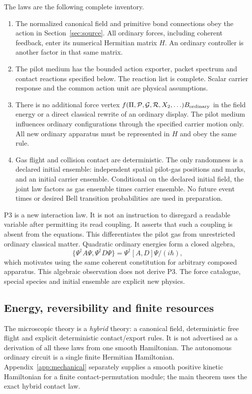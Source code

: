 \documentclass[11pt]{article}
\theoremstyle{definition}\newtheorem{definition}[theorem]{Definition}
\theoremstyle{remark}\newtheorem{remark}[theorem]{Remark}
\begin{document}
The laws are the following complete inventory.
\begin{enumerate}[label=\textbf{P\arabic*.}]
\item The normalized canonical field and primitive bond connections obey the action in Section~\ref{sec:source}. All ordinary forces, including coherent feedback, enter its numerical Hermitian matrix $H$. An ordinary controller is another factor in that same matrix.
\item The pilot medium has the bounded action exporter, packet spectrum and contact reactions specified below. The reaction list is complete. Scalar carrier response and the common action unit are physical assumptions.
\item There is no additional force vertex $f(\Pi,\mathcal P,\mathcal G,\mathcal R,X_2,\ldots)B_{\rm ordinary}$ in the field energy or a direct classical rewrite of an ordinary display. The pilot medium influences ordinary configurations through the specified carrier motion only. All new ordinary apparatus must be represented in $H$ and obey the same rule.
\item Gas flight and collision contact are deterministic. The only randomness is a declared initial ensemble: independent spatial pilot-gas positions and marks, and an initial carrier ensemble. Conditional on the declared initial field, the joint law factors as gas ensemble times carrier ensemble. No future event times or desired Bell transition probabilities are used in preparation.
\end{enumerate}
P3 is a new interaction law. It is not an instruction to disregard a readable variable after permitting its read coupling. It asserts that such a coupling is absent from the equations. This differentiates the pilot gas from unrestricted ordinary classical matter. Quadratic ordinary energies form a closed algebra,
\[
 \{\Psi^\dagger A\Psi,\Psi^\dagger D\Psi\}
   =\Psi^\dagger[A,D]\Psi/(i\hbar),
\]
which motivates using the same coherent constitution for arbitrary composed apparatus. This algebraic observation does not derive P3. The force catalogue, special species and initial ensemble are explicit new physics.

\subsection{Energy, reversibility and finite resources}
The microscopic theory is a \emph{hybrid} theory: a canonical field, deterministic free flight and explicit deterministic contact/export rules. It is not advertised as a derivation of all these laws from one smooth Hamiltonian. The autonomous ordinary circuit is a single finite Hermitian Hamiltonian. Appendix~\ref{app:mechanical} separately supplies a smooth positive kinetic Hamiltonian for a finite contact-permutation module; the main theorem uses the exact hybrid contact law.
\end{document}
